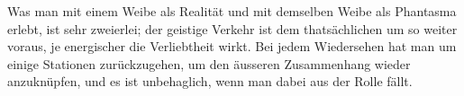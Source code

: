 Was man mit einem Weibe als Realität und mit demselben Weibe als Phantasma erlebt, ist sehr zweierlei; der geistige Verkehr ist dem thatsächlichen um so weiter voraus, je energischer die Verliebtheit wirkt. Bei jedem Wiedersehen hat man um einige Stationen zurückzugehen, um den äusseren Zusammenhang wieder anzuknüpfen, und es ist unbehaglich, wenn man dabei aus der Rolle fällt.
\par

